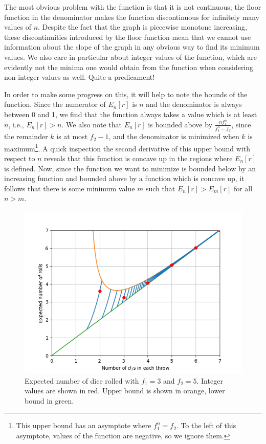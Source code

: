 \documentclass{article}
\begin{document}
The most obvious problem with the function is that it is not continuous; the floor function in the denominator makes the function discontinuous for infinitely many values of $n$.
Despite the fact that the graph is piecewise monotone increasing, these discontinuities introduced by the floor function mean that we cannot use information about the slope of the graph in any obvious way to find its minimum values.
We also care in particular about integer values of the function, which are evidently not the minima one would obtain from the function when considering non-integer values as well.
Quite a predicament!
\par In order to make some progress on this, it will help to note the bounds of the function.
Since the numerator of $E_n[r]$ is $n$ and the denominator is always between 0 and 1, we find that the function always takes a value which is at least $n$, i.e., $E_n[r] > n$.
We also note that $E_n[r]$ is bounded above by $\frac{nf_1^n}{f_1^n-f_2}$, since the remainder $k$ is at most $f_2 - 1$, and the denominator is minimized when $k$ is maximum\footnote{This upper bound has an asymptote where $f_1^n=f_2$. To the left of this asymptote, values of the function are negative, so we ignore them.}.
A quick inspection the second derivative of this upper bound with respect to $n$ reveals that this function is concave up in the regions where $E_n[r]$ is defined.
Now, since the function we want to minimize is bounded below by an increasing function and bounded above by a function which is concave up, it follows that there is some minimum value $m$ such that $E_n[r] > E_m[r]$ for all $n > m$.
\begin{figure}
    \centering
    \includegraphics[scale=0.5]{num-rolls-with-bounds.png}
    \caption{Expected number of dice rolled with $f_1=3$ and $f_2=5$. Integer values are shown in red. Upper bound is shown in orange, lower bound in green.}
    \label{fig:num-rolls}
\end{figure}
\end{document}
